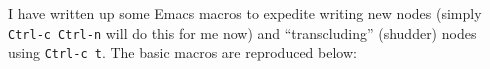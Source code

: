 \begin{node}\label{amn-0002}%
I have written up some Emacs macros to expedite writing new nodes
(simply \verb|Ctrl-c Ctrl-n| will do this for me now) and
``transcluding'' (shudder) nodes using \verb|Ctrl-c t|. The basic macros
are reproduced below:

\end{node}
